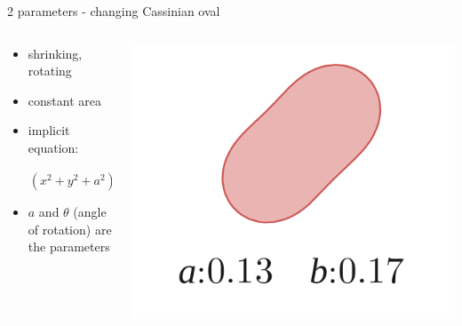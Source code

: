 \documentclass[aspectratio=169,xcolor=dvipsnames]{beamer}
\begin{document}
\begin{frame}{2 parameters - changing Cassinian oval}
	\begin{columns}
		\begin{column}{.6\textwidth}
			\begin{itemize}
				\setlength\itemsep{1.4em}
				\item shrinking, rotating
				\item constant area
				\item implicit equation:
			\end{itemize}		
			\vspace{4mm}
			$$ \ \ \ \ \ \ \ \ \left( x^{2}+ y^{2}+a^{2} \right)^{2}-4 x ^{2} a^{2}-b^{4} = 0 $$
			\vspace{-3mm}
			\begin{itemize}
				\item $ a $ and $ \theta $ (angle of rotation) are the parameters
			\end{itemize}	
		\end{column}
		\begin{column}{.4\textwidth}
			\includegraphics[width=0.9\linewidth, trim={0 0 0 0}, clip]{Images/a2.png}			
		\end{column}
	\end{columns}	
\end{frame}
\end{document}
